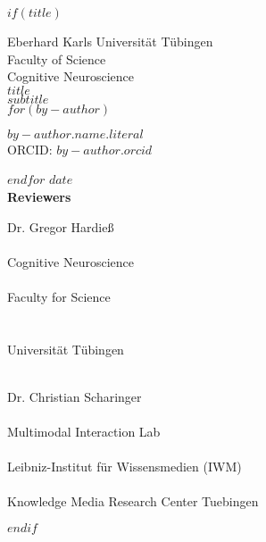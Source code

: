 
$if(title)$
{
\centering
\huge Eberhard Karls Universität Tübingen \\
\Large Faculty of Science \\
\Large Cognitive Neuroscience \\
\vspace{7ex}
\huge\textbf{$title$}\\
\huge $subtitle$\\
\vspace{3ex}
$for(by-author)$
\begin{center}
\Large $by-author.name.literal$\\
\large ORCID: \href{https://orcid.org/$by-author.orcid$}{$by-author.orcid$}
\end{center}
$endfor$
\vspace{3ex}
\Large $date$\\
\vspace{5ex}
\Large\textbf{Reviewers}\\
\vspace{2ex}
\parbox{0.5\textwidth}{
	\begin{center}
		{\Large Dr. Gregor Hardieß}\\
		~\\
		\large Cognitive Neuroscience\\
		~\\
		Faculty for Science\\
		~\\
		~\\
		Universität Tübingen\\
		~\\
	\end{center}}
\hfill
\parbox{0.5\textwidth}{
	\begin{center}
  		{\Large Dr. Christian Scharinger}\\
  		~\\
  		\large Multimodal Interaction Lab\\
  		~\\
  		Leibniz-Institut für Wissensmedien (IWM)\\
  		~\\
  		Knowledge Media Research Center Tuebingen
  	\end{center}
 }
}
$endif$